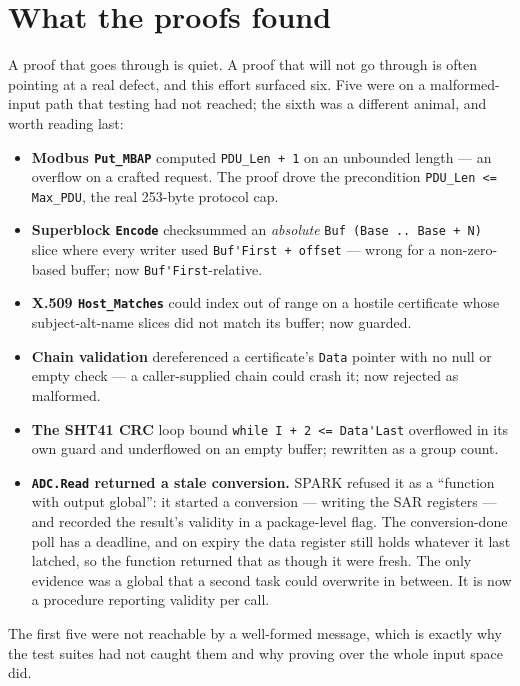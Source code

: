 \section{What the proofs found}

A proof that goes through is quiet. A proof that will not go through is often pointing
at a real defect, and this effort surfaced six. Five were on a malformed-input path
that testing had not reached; the sixth was a different animal, and worth reading
last:

\begin{itemize}
  \item \textbf{Modbus \lstinline{Put_MBAP}} computed \lstinline{PDU_Len + 1} on an
    unbounded length --- an overflow on a crafted request. The proof drove the
    precondition \lstinline{PDU_Len <= Max_PDU}, the real 253-byte protocol cap.
  \item \textbf{Superblock \lstinline{Encode}} checksummed an \emph{absolute}
    \lstinline{Buf (Base .. Base + N)} slice where every writer used
    \lstinline{Buf'First + offset} --- wrong for a non-zero-based buffer; now
    \lstinline{Buf'First}-relative.
  \item \textbf{X.509 \lstinline{Host_Matches}} could index out of range on a hostile
    certificate whose subject-alt-name slices did not match its buffer; now guarded.
  \item \textbf{Chain validation} dereferenced a certificate's \lstinline{Data} pointer
    with no null or empty check --- a caller-supplied chain could crash it; now rejected
    as malformed.
  \item \textbf{The SHT41 CRC} loop bound \lstinline{while I + 2 <= Data'Last} overflowed
    in its own guard and underflowed on an empty buffer; rewritten as a group count.
  \item \textbf{\lstinline{ADC.Read} returned a stale conversion.} SPARK refused it as
    a ``function with output global'': it started a conversion --- writing the SAR
    registers --- and recorded the result's validity in a package-level flag. The
    conversion-done poll has a deadline, and on expiry the data register still holds
    whatever it last latched, so the function returned that as though it were fresh.
    The only evidence was a global that a second task could overwrite in between. It is
    now a procedure reporting validity per call.
\end{itemize}

The first five were not reachable by a well-formed message, which is exactly why the
test suites had not caught them and why proving over the whole input space did.

